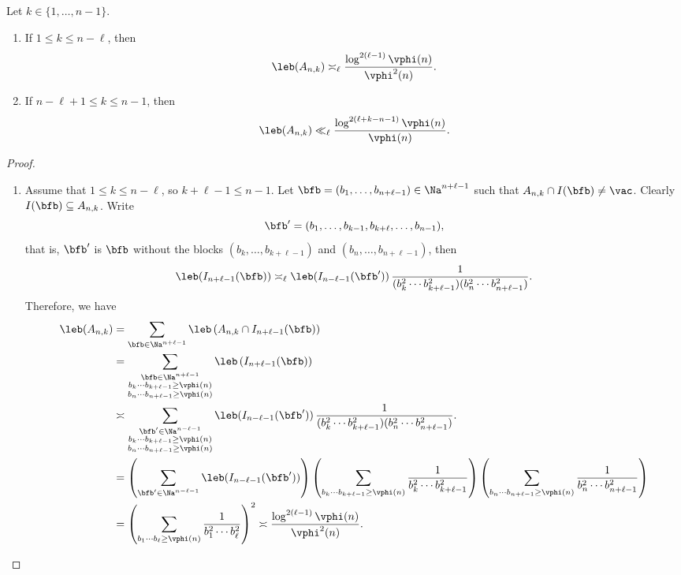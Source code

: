 \documentclass[12pt,a4paper]{amsart}
\begin{document}
\begin{lem01}
Let $k\in\{1,\ldots, n-1\}$.
\begin{enumerate}[1.]
\item If $1\leq k \leq n-\ell$, then 
\[
\leb( A_{n,k})
\asymp_{\ell} 
\frac{\log^{2(\ell-1)}\vphi(n)}{\vphi^2(n)}.
\]
\item If $n-\ell +1 \leq k\leq n- 1$, then 
\[
\leb( A_{n,k})
\ll_{\ell} 
\frac{\log^{2(\ell+k-n-1)}\vphi(n)}{\vphi(n)}.
\]
\end{enumerate}
\end{lem01}
\begin{proof}
\begin{enumerate}[1.]
\item Assume that $1\leq k\leq n-\ell$, so $k+\ell-1 \leq n-1$. Let $\bfb=(b_1,\ldots, b_{n+\ell-1})\in\Na^{n+\ell-1}$ such that $A_{n,k}\cap I(\bfb)\neq \vac$. Clearly $I(\bfb)\subseteq A_{n,k}$. Write
\[
\bfb'=(b_1,\ldots, b_{k-1},b_{k+\ell},\ldots, b_{n-1}),
\]
that is, $\bfb'$ is $\bfb$ without the blocks $(b_{k},\ldots, b_{k+\ell-1})$ and $(b_n,\ldots, b_{n+\ell-1})$, then
\[
\leb(I_{n+\ell-1}(\bfb))
\asymp_{\ell}
\leb(I_{n-\ell-1}(\bfb')) \, 
\frac{1}{(b_{k}^2\cdots b_{k+\ell-1}^2) (b_{n}^2\cdots b_{n+\ell-1}^2)}.
\]
Therefore, we have
\begin{align*}
\leb(A_{n,k})
&=
\sum_{\bfb\in \Na^{n+\ell-1}} \leb\left(A_{n,k}\cap I_{n+\ell-1}(\bfb)\right)
\nonumber\\
&=
\sum_{\substack{\bfb\in \Na^{n+\ell-1}\\ b_{k}\cdots b_{k+\ell-1}\geq \vphi(n)\\ b_{n}\cdots b_{n+\ell-1}\geq \vphi(n) }} 
\leb\left(I_{n+\ell-1}(\bfb)\right) \nonumber\\
&\asymp
\sum_{\substack{\bfb'\in \Na^{n-\ell-1}\\ b_{k}\cdots b_{k+\ell-1}\geq \vphi(n)\\ b_{n}\cdots b_{n+\ell-1}\geq \vphi(n) }} 
\leb(I_{n-\ell-1}(\bfb')) \, 
\frac{1}{(b_{k}^2\cdots b_{k+\ell-1}^2) (b_{n}^2\cdots b_{n+\ell-1}^2)}.
\nonumber\\
&=
\left(\sum_{\bfb'\in \Na^{n-\ell-1}} 
\leb(I_{n-\ell-1}(\bfb') ) \right)
\left(\sum_{b_{k}\cdots b_{k+\ell-1}\geq \vphi(n) } 
\frac{1}{b_{k}^2\cdots b_{k+\ell-1}^2}\right)
\left(\sum_{b_{n}\cdots b_{n+\ell-1}\geq \vphi(n) } 
\frac{1}{b_{n}^2\cdots b_{n+\ell-1}^2}\right) \nonumber\\
&=
\left(\sum_{b_{1}\cdots b_{\ell}\geq \vphi(n) } 
\frac{1}{b_{1}^2\cdots b_{\ell}^2}\right)^2 
\asymp
\frac{\log^{2(\ell-1)}\vphi(n)}{\vphi^2(n)}. 

\end{align*}
\end{enumerate}
\end{proof}
\end{document}
